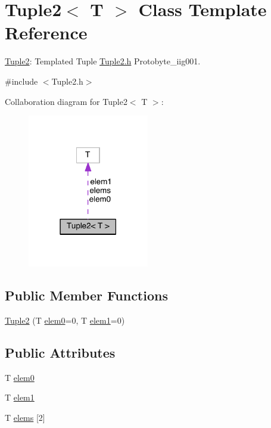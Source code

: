 \hypertarget{class_tuple2}{\section{Tuple2$<$ T $>$ Class Template Reference}
\label{class_tuple2}
}


\hyperlink{class_tuple2}{Tuple2}\-: Templated Tuple \hyperlink{_tuple2_8h}{Tuple2.\-h} Protobyte\-\_\-iig001.  




{\ttfamily \#include $<$Tuple2.\-h$>$}



Collaboration diagram for Tuple2$<$ T $>$\-:
\nopagebreak
\begin{figure}[H]
\begin{center}
\leavevmode
\includegraphics[width=150pt]{class_tuple2__coll__graph}
\end{center}
\end{figure}
\subsection*{Public Member Functions}
\begin{DoxyCompactItemize}
\item 
\hyperlink{class_tuple2_a1e54ff81881b7721221eeb762f02638c}{Tuple2} (T \hyperlink{class_tuple2_a4e0719c8a581b8bb0364ac7844f9595c}{elem0}=0, T \hyperlink{class_tuple2_af54ac08b6fec1928d270c833aa954a25}{elem1}=0)
\end{DoxyCompactItemize}
\subsection*{Public Attributes}
\begin{DoxyCompactItemize}
\item 
T \hyperlink{class_tuple2_a4e0719c8a581b8bb0364ac7844f9595c}{elem0}
\item 
T \hyperlink{class_tuple2_af54ac08b6fec1928d270c833aa954a25}{elem1}
\item 
T \hyperlink{class_tuple2_a8b401e83aad88ad59bfb21f89329c2a0}{elems} \mbox{[}2\mbox{]}
\end{DoxyCompactItemize}


